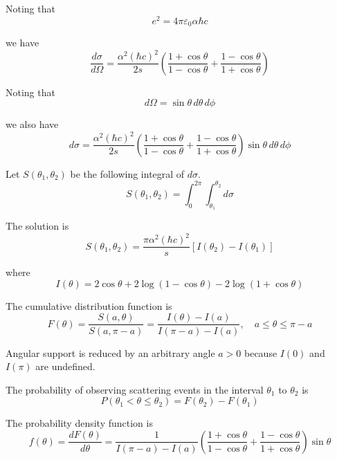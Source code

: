 Noting that
\begin{equation*}
e^2=4\pi\varepsilon_0\alpha\hbar c
\end{equation*}

we have
\begin{equation*}
\frac{d\sigma}{d\Omega}
=
\frac{\alpha^2(\hbar c)^2}{2s}
\left(
\frac{1+\cos\theta}{1-\cos\theta}+
\frac{1-\cos\theta}{1+\cos\theta}
\right)
\end{equation*}

Noting that
\begin{equation*}
d\Omega=\sin\theta\,d\theta\,d\phi
\end{equation*}

we also have
\begin{equation*}
d\sigma=
\frac{\alpha^2(\hbar c)^2}{2s}
\left(
\frac{1+\cos\theta}{1-\cos\theta}+
\frac{1-\cos\theta}{1+\cos\theta}
\right)\sin\theta\,d\theta\,d\phi
\end{equation*}

Let $S(\theta_1,\theta_2)$ be the following integral of $d\sigma$.
\begin{equation*}
S(\theta_1,\theta_2)=\int_0^{2\pi}\int_{\theta_1}^{\theta_2}d\sigma
\end{equation*}

The solution is
\begin{equation*}
S(\theta_1,\theta_2)=\frac{\pi\alpha^2(\hbar c)^2}{s}
[I(\theta_2)-I(\theta_1)]
\end{equation*}

where
\begin{equation*}
I(\theta)=2\cos\theta+2\log(1-\cos\theta)-2\log(1+\cos\theta)
\end{equation*}

The cumulative distribution function is
\begin{equation*}
F(\theta)
=\frac{S(a,\theta)}{S(a,\pi-a)}
=\frac{I(\theta)-I(a)}{I(\pi-a)-I(a)},
\quad
a\le\theta\le\pi-a
\end{equation*}

Angular support is reduced by an arbitrary angle $a>0$ because $I(0)$ and $I(\pi)$ are undefined.

\bigskip
The probability of observing scattering events in the interval $\theta_1$ to $\theta_2$ is
\begin{equation*}
P(\theta_1<\theta\le\theta_2)=F(\theta_2)-F(\theta_1)
\end{equation*}

The probability density function is
\begin{equation*}
f(\theta)=\frac{dF(\theta)}{d\theta}
=\frac{1}{I(\pi-a)-I(a)}
\left(\frac{1+\cos\theta}{1-\cos\theta}+\frac{1-\cos\theta}{1+\cos\theta}\right)
\sin\theta
\end{equation*}


